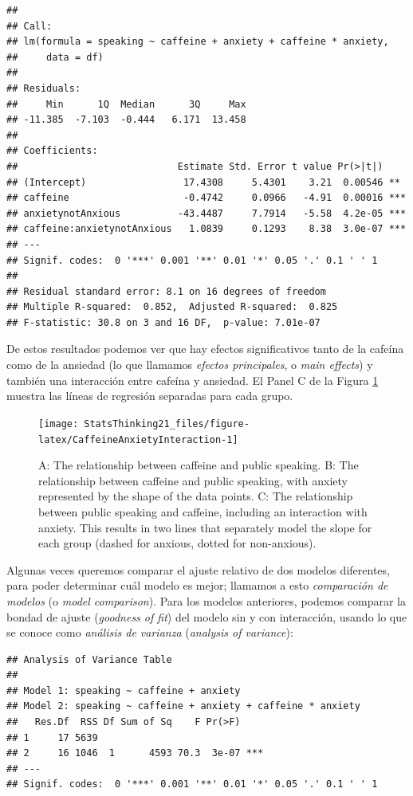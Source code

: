 \documentclass[
  12pt,
]{book}
\begin{document}
\begin{verbatim}
## 
## Call:
## lm(formula = speaking ~ caffeine + anxiety + caffeine * anxiety, 
##     data = df)
## 
## Residuals:
##     Min      1Q  Median      3Q     Max 
## -11.385  -7.103  -0.444   6.171  13.458 
## 
## Coefficients:
##                            Estimate Std. Error t value Pr(>|t|)    
## (Intercept)                 17.4308     5.4301    3.21  0.00546 ** 
## caffeine                    -0.4742     0.0966   -4.91  0.00016 ***
## anxietynotAnxious          -43.4487     7.7914   -5.58  4.2e-05 ***
## caffeine:anxietynotAnxious   1.0839     0.1293    8.38  3.0e-07 ***
## ---
## Signif. codes:  0 '***' 0.001 '**' 0.01 '*' 0.05 '.' 0.1 ' ' 1
## 
## Residual standard error: 8.1 on 16 degrees of freedom
## Multiple R-squared:  0.852,  Adjusted R-squared:  0.825 
## F-statistic: 30.8 on 3 and 16 DF,  p-value: 7.01e-07
\end{verbatim}

De estos resultados podemos ver que hay efectos significativos tanto de la cafeína como de la ansiedad (lo que llamamos \emph{efectos principales}, o \emph{main effects}) y también una interacción entre cafeína y ansiedad. El Panel C de la Figura \ref{fig:CaffeineAnxietyInteraction} muestra las líneas de regresión separadas para cada grupo.

\begin{figure}
\texttt{[image: StatsThinking21\_files/figure-latex/CaffeineAnxietyInteraction-1]} \caption{A: The relationship between caffeine and public speaking. B: The relationship between caffeine and public speaking, with anxiety represented by the shape of the data points. C: The relationship between public speaking and caffeine, including an interaction with anxiety.  This results in two lines that separately model the slope for each group (dashed for anxious, dotted for non-anxious).}\label{fig:CaffeineAnxietyInteraction}
\end{figure}

Algunas veces queremos comparar el ajuste relativo de dos modelos diferentes, para poder determinar cuál modelo es mejor; llamamos a esto \emph{comparación de modelos} (o \emph{model comparison}). Para los modelos anteriores, podemos comparar la bondad de ajuste (\emph{goodness of fit}) del modelo sin y con interacción, usando lo que se conoce como \emph{análisis de varianza} (\emph{analysis of variance}):

\begin{verbatim}
## Analysis of Variance Table
## 
## Model 1: speaking ~ caffeine + anxiety
## Model 2: speaking ~ caffeine + anxiety + caffeine * anxiety
##   Res.Df  RSS Df Sum of Sq    F Pr(>F)    
## 1     17 5639                             
## 2     16 1046  1      4593 70.3  3e-07 ***
## ---
## Signif. codes:  0 '***' 0.001 '**' 0.01 '*' 0.05 '.' 0.1 ' ' 1
\end{verbatim}
\end{document}
